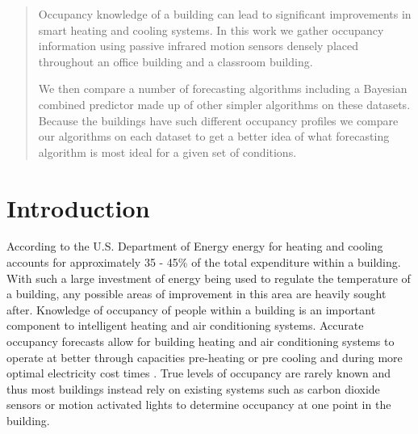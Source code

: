 \documentclass{acm_proc_article-sp}
\begin{document}
\date{17 May 2013}


\maketitle
\begin{abstract}
Occupancy knowledge of a building can lead to significant improvements in smart heating and cooling systems.  In this work we gather occupancy information using passive infrared motion sensors densely placed throughout an office building and a classroom building.  

We then compare a number of forecasting algorithms including a Bayesian combined predictor made up of other simpler algorithms on these datasets.  Because the buildings have such different occupancy profiles we compare our algorithms on each dataset to get a better idea of what forecasting algorithm is most ideal for a given set of conditions.  
\end{abstract}




\section{Introduction}

According to the U.S. Department of Energy energy for heating and cooling accounts for approximately 35 - 45\% \cite{DOE2010} of the total expenditure within a building. With such a large investment of energy being used to regulate the temperature of a building, any possible areas of improvement in this area are heavily sought after.  Knowledge of occupancy of people within a building is an important component to intelligent heating and air conditioning systems.  Accurate occupancy forecasts allow for building heating and air conditioning systems to operate at better through capacities pre-heating or pre cooling and during more optimal electricity cost times \cite{Ma2010}.  True levels of occupancy are rarely known and thus most buildings instead rely on existing systems such as carbon dioxide sensors or motion activated lights to determine occupancy at one point in the building.
\end{document}
